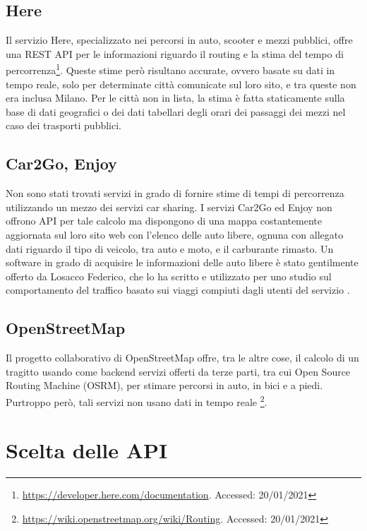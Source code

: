 \subsection{Here}

Il servizio Here, specializzato nei percorsi in auto, scooter e mezzi pubblici, offre una REST API per le informazioni riguardo il routing e la stima del tempo di percorrenza\footnote{\url{https://developer.here.com/documentation}. Accessed: 20/01/2021}. Queste stime però risultano accurate, ovvero basate su dati in tempo reale, solo per determinate città comunicate sul loro sito, e tra queste non era inclusa Milano. Per le città non in lista, la stima è fatta staticamente sulla base di dati geografici o dei dati tabellari degli orari dei passaggi dei mezzi nel caso dei trasporti pubblici.

\subsection{Car2Go, Enjoy}

Non sono stati trovati servizi in grado di fornire stime di tempi di percorrenza utilizzando un mezzo dei servizi car sharing. I servizi Car2Go ed Enjoy non offrono API per tale calcolo ma dispongono di una mappa costantemente aggiornata sul loro sito web con l'elenco delle auto libere, ognuna con allegato dati riguardo il tipo di veicolo, tra auto e moto, e il carburante rimasto. Un software in grado di acquisire le informazioni delle auto libere è stato gentilmente offerto da Losacco Federico, che lo ha scritto e utilizzato per uno studio sul comportamento del traffico basato sui viaggi compiuti dagli utenti del servizio \cite{trentini2017sampling}.

\subsection{OpenStreetMap}

Il progetto collaborativo di OpenStreetMap offre, tra le altre cose, il calcolo di un tragitto usando come backend servizi offerti da terze parti, tra cui Open Source Routing Machine (OSRM), per stimare percorsi in auto, in bici e a piedi. Purtroppo però, tali servizi non usano dati in tempo reale \footnote{\url{https://wiki.openstreetmap.org/wiki/Routing}. Accessed: 20/01/2021}.

\section{Scelta delle API}

